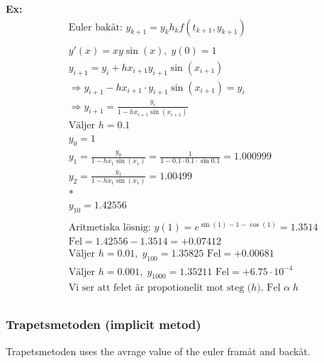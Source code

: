 \documentclass{article}
\begin{document}
\textbf{Ex:}
\begin{align*}
  &\quad  \text{Euler bakåt: } y_{k+1} = y_k h_kf(t_{k+1},y_{k+1}) \\
  &\quad  \\
  &\quad  y'(x) = xy\sin{(x)}, \; y(0)=1 \\
  &\quad  y_{i+1} = y_i + hx_{i+1}y_{i+1}\sin{(x_{i+1})} \\
  &\quad  \Rightarrow y_{i+1} -hx_{i+1}\cdot{y_{i+1}}\sin{(x_{i+1})} = y_i \\
  &\quad  \Rightarrow y_{i+1} = \frac{y_i}{1 -hx_{i+1}\sin{(x_{i+1})}} \\
  &\quad  \text{Väljer $h=0.1$} \\
  &\quad  y_0 = 1 \\
  &\quad  y_1 = \frac{y_0}{1 -hx_{1}\sin{(x_{1})}} = \frac{1}{1 -0.1\cdot0.1\cdot\sin{0.1}}
        = 1.000999 \\
  &\quad  y_2 = \frac{y_1}{1 -hx_{1}\sin{(x_{1})}} = 1.00499 \\
  &\quad  * \\
  &\quad  y_{10} = 1.42556 \\
  &\quad  \\
  &\quad  \text{Aritmetiska lösnig: } y(1)=e^{\sin{(1)-1-\cos{(1)}}} = 1.3514 \\
  &\quad  \text{Fel} = 1.42556-1.3514 = +0.07412 \\
  &\quad  \text{Väljer } h=0.01, \; y_{100} = 1.35825 \text{ Fel} = +0.00681 \\
  &\quad  \text{Väljer } h=0.001, \; y_{1000} = 1.35211 \text{ Fel} = +6.75\cdot10^{-4} \\
  &\quad  \text{Vi ser att felet är propotionelit mot steg ($h$). Fel } \alpha \; h \\
\end{align*}

\newpage
\subsubsection{Trapetsmetoden (implicit metod)}
Trapetsmetoden uses the avrage value of the euler framåt and backåt.
\end{document}
